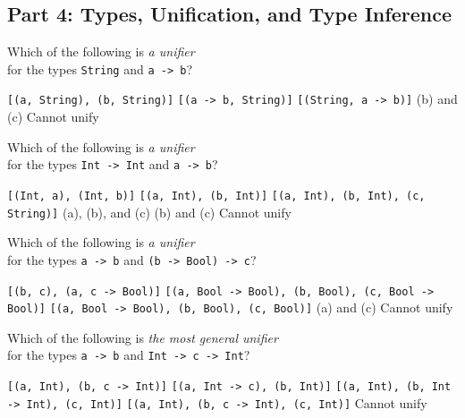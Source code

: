 \documentclass[addpoints]{exam}
\begin{document}
\begin{questions}
\begin{parts}
\end{parts}

\newpage

\subsection*{\textbf{Part 4: Types, Unification, and Type Inference}}

\question[3] Which of the following is \emph{a unifier} \\ for the types \texttt{String} and \texttt{a -> b}?

\begin{choices}
  \choice \texttt{[(a, String), (b, String)]}
  \choice \texttt{[(a -> b, String)]}
  \choice \texttt{[(String, a -> b)]}
  \choice (b) and (c)
  \CorrectChoice Cannot unify
\end{choices}

\question[3] Which of the following is \emph{a unifier} \\ for the types \texttt{Int -> Int} and \texttt{a -> b}?

\begin{choices}
  \choice \texttt{[(Int, a), (Int, b)]}
  \choice \texttt{[(a, Int), (b, Int)]}
  \choice \texttt{[(a, Int), (b, Int), (c, String)]}
  \choice (a), (b), and (c)
  \CorrectChoice (b) and (c)
  \choice Cannot unify
\end{choices}

\question[3] Which of the following is \emph{a unifier} \\ for the types \verb|a -> b| and \verb|(b -> Bool) -> c|?

\begin{choices}
  \choice \texttt{[(b, c), (a, c -> Bool)]}
  \choice \texttt{[(a, Bool -> Bool), (b, Bool), (c, Bool -> Bool)]}
  \choice \texttt{[(a, Bool -> Bool), (b, Bool), (c, Bool)]}
  \CorrectChoice (a) and (c)
  \choice Cannot unify
\end{choices}

\question[3] Which of the following is \emph{the most general unifier} \\ for the types \verb|a -> b| and \verb|Int -> c -> Int|?

\begin{choices}
  \CorrectChoice \texttt{[(a, Int), (b, c -> Int)]}
  \choice \texttt{[(a, Int -> c), (b, Int)]}
  \choice \texttt{[(a, Int), (b, Int -> Int), (c, Int)]}
  \choice \texttt{[(a, Int), (b, c -> Int), (c, Int)]}
  \choice Cannot unify
\end{choices}


\end{questions}
\end{document}
